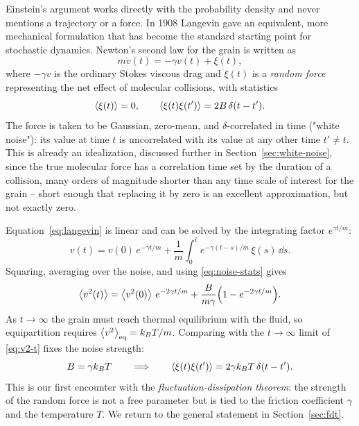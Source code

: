 Einstein's argument works directly with the probability density and never
mentions a trajectory or a force. In 1908 Langevin gave an equivalent, more
mechanical formulation that has become the standard starting point for
stochastic dynamics. Newton's second law for the grain is written as
\begin{equation}
m\dot v(t) = -\gamma v(t) + \xi(t),
\label{eq:langevin}
\end{equation}
where $-\gamma v$ is the ordinary Stokes viscous drag and $\xi(t)$ is a
\emph{random force} representing the net effect of molecular collisions,
with statistics
\begin{equation}
\left\langle \xi(t) \right\rangle = 0, \qquad \left\langle \xi(t)\xi(t') \right\rangle = 2B\,\delta(t-t').
\label{eq:noise-stats}
\end{equation}
The force is taken to be Gaussian, zero-mean, and $\delta$-correlated in
time ("white noise"): its value at time $t$ is uncorrelated with its value
at any other time $t'\neq t$. This is already an idealization, discussed
further in Section~\ref{sec:white-noise}, since the true molecular force
has a correlation time set by the duration of a collision, many orders of
magnitude shorter than any time scale of interest for the grain -- short
enough that replacing it by zero is an excellent approximation, but not
exactly zero.

Equation~\eqref{eq:langevin} is linear and can be solved by the integrating
factor $e^{\gamma t/m}$:
\begin{equation}
v(t) = v(0)\,e^{-\gamma t/m} + \frac{1}{m}\int_0^t e^{-\gamma (t-s)/m}\,\xi(s)\,\dd s.
\label{eq:v-solution}
\end{equation}
Squaring, averaging over the noise, and using \eqref{eq:noise-stats} gives
\begin{equation}
\left\langle v^2(t) \right\rangle = \left\langle v^2(0) \right\rangle\,e^{-2\gamma t/m}
+ \frac{B}{m\gamma}\Bigl(1 - e^{-2\gamma t/m}\Bigr).
\label{eq:v2-t}
\end{equation}
As $t\to\infty$ the grain must reach thermal equilibrium with the fluid, so
equipartition requires $\left\langle v^2 \right\rangle_{\rm eq} = k_{B} T/m$. Comparing with the
$t\to\infty$ limit of \eqref{eq:v2-t} fixes the noise strength:
\begin{equation}
B = \gamma k_{B} T
\qquad\Longrightarrow\qquad
\left\langle \xi(t)\xi(t') \right\rangle = 2\gamma k_{B} T\,\delta(t-t').
\label{eq:fdt-langevin}
\end{equation}
This is our first encounter with the \emph{fluctuation-dissipation
theorem}: the strength of the random force is not a free parameter but is
tied to the friction coefficient $\gamma$ and the temperature $T$. We
return to the general statement in Section~\ref{sec:fdt}.

